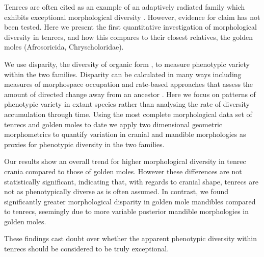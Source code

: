 \documentclass[12pt,a4paper]{article}
\begin{document}
	Tenrecs are often cited as an example of an adaptively radiated family which exhibits exceptional morphological diversity \citep{Soarimalala2011, Olson2003, Eisenberg1969}. However, evidence for claim has not been tested. Here we present the first quantitative investigation of morphological diversity in tenrecs, and how this compares to their closest relatives, the golden moles (Afrosoricida, Chryscholoridae). 

	We use disparity, the diversity of organic form \citep{Foote1997, Wills1994, Erwin2007}, to measure phenotypic variety within the two families. 
	Disparity can be calculated in many ways including measures of morphospace occupation \citep[e.g.][]{Goswami2011, Brusatte2008} and rate-based approaches that assess the amount of directed change away from an ancestor \citep{OMeara2006, Price2013}. Here we focus on patterns of phenotypic variety in extant species rather than analysing the rate of diversity accumulation through time. 
	Using the most complete morphological data set of tenrecs and golden moles to date
	 we apply two dimensional geometric morphometrics \citep{Rohlf1993, Adams2013} to quantify variation in cranial and mandible morphologies as proxies for phenotypic diversity in the two families. 

	Our results show an overall trend for higher morphological diversity in tenrec crania compared to those of golden moles. However these differences are not statistically significant, indicating that, with regards to cranial shape, tenrecs are not as phenotypically diverse as is often assumed. %
	In contrast, we found significantly greater morphological disparity in golden mole mandibles compared to tenrecs, seemingly due to more variable posterior mandible morphologies in golden moles. %
	
	These findings cast doubt over whether the apparent phenotypic diversity within tenrecs should be considered to be truly exceptional. 
\end{document}
